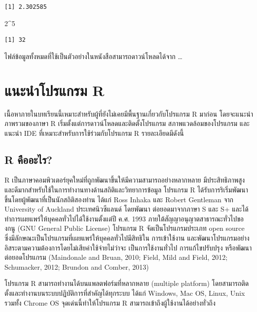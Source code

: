 \documentclass[
  a4paper,
]{book}
\newenvironment{Shaded}{\begin{snugshade}}{\end{snugshade}}
\newcommand{\DecValTok}[1]{\textcolor[rgb]{0.68,0.00,0.00}{#1}}
\newcommand{\SpecialCharTok}[1]{\textcolor[rgb]{0.37,0.37,0.37}{#1}}
\begin{document}
\begin{verbatim}
[1] 2.302585
\end{verbatim}

\begin{Shaded}
\begin{Highlighting}[]
\DecValTok{2}\SpecialCharTok{\^{}}\DecValTok{5}
\end{Highlighting}
\end{Shaded}

\begin{verbatim}
[1] 32
\end{verbatim}

ไฟล์ข้อมูลทั้งหมดที่ใช้เป็นตัวอย่างในหนังสือสามารถดาวน์โหลดได้จาก \ldots{}


\chapter{แนะนำโปรแกรม
R}\label{uxe41uxe19uxe30uxe19uxe33uxe42uxe1buxe23uxe41uxe01uxe23uxe21-r}

เนื้อหาภายในบทเรียนนี้เหมาะสำหรับผู้ที่ยังไม่เคยมีพื้นฐานเกี่ยวกับโปรแกรม R มาก่อน
โดยจะแนะนำภาพรวมของภาษา R เริ่มตั้งแต่การดาวน์โหลดและติดตั้งโปรแกรม
สภาพแวดล้อมของโปรแกรม และแนะนำ IDE ที่เหมาะสำหรับการใช้ร่วมกับโปรแกรม R
รายละเอียดมีดังนี้

\section{R คืออะไร?}\label{r-uxe04uxe2duxe2duxe30uxe44uxe23}

R เป็นภาษาคอมพิวเตอร์ยุคใหม่ที่ถูกพัฒนาขึ้นให้มีความสามารถอย่างหลากหลาย มีประสิทธิภาพสูง
และดีมากสำหรับใช้ในการทำงานทางด้านสถิติและวิทยาการข้อมูล โปรแกรม R
ได้รับการริเริ่มพัฒนาขึ้นโดยผู้พัฒนาที่เป็นนักสถิติสองท่าน ได้แก่ Ross Inhaka และ Robert
Gentleman จาก University of Auckland ประเทศนิวซีแลนด์ โดยพัฒนา
ต่อยอดมาจากภาษา S และ S+ และได้ทำการเผยแพร่ให้บุคคลทั่วไปได้ใช้งานตั้งแต่ปี ค.ศ. 1993
ภายใต้สัญญาอนุญาตสาธารณะทั่วไปของกนู (GNU General Public License) โปรแกรม R
จัดเป็นโปรแกรมประเภท open source ซึ่งมีลักษณะเป็นโปรแกรมที่เผยแพร่ให้บุคคลทั่วไปมีสิทธิใน
การเข้าใช้งาน และพัฒนาโปรแกรมอย่างอิสระตามความต้องการโดยไม่เสียค่าใช้จ่ายไม่ว่าจะ
เป็นการใช้งานทั่วไป การแก้ไขปรับปรุง หรือพัฒนาต่อยอดโปรแกรม (Maindonale and Bruan,
2010; Field, Mild and Field, 2012; Schumacker, 2012; Brundon and Comber,
2013)

โปรแกรม R สามารถทำงานได้บนแพลตฟอร์มที่หลากหลาย (multiple platform)
โดยสามารถติดตั้งและทำงานบนระบบปฏิบัติการที่สำคัญได้ทุกระบบ ได้แก่ Windows, Mac OS,
Linux, Unix รวมทั้ง Chrome OS จุดเด่นนี้ทำให้โปรแกรม R
สามารถเข้าถึงผู้ใช้งานได้อย่างทั่วถึง
\end{document}
